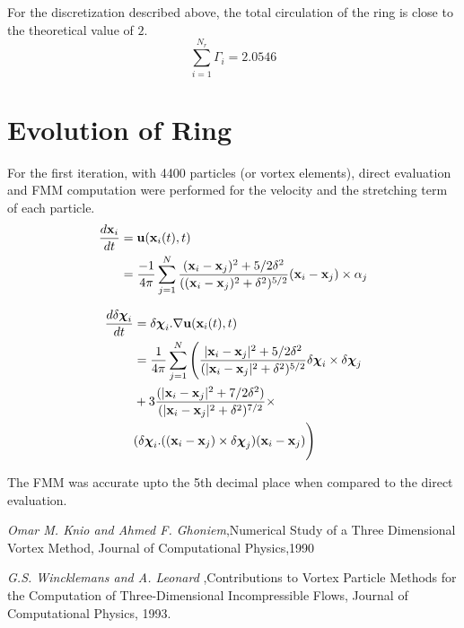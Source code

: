 \documentclass[10pt,a4paper]{report}
\newcommand{\xv}{{\bf x}}
\newcommand{\chiv}{{\boldsymbol \chi}}
\newcommand{\uv}{{\bf u}}
\begin{document}
For the discretization described above, the total circulation of the ring is close to the theoretical value of $2$.
\begin{equation}
\sum_{i=1}^{N_r} \Gamma_i = 2.0546 
\end{equation}

\section{Evolution of Ring}
For the first iteration, with 4400 particles (or vortex elements), direct evaluation and FMM computation were performed for the velocity and the stretching term of each particle.
\begin{align}
\frac{d\xv_i}{dt} &= \uv(\xv_i(t),t) \\
				&=  \frac{-1}{4\pi} \displaystyle \sum_{j=1}^{N} \frac{(\xv_i - \xv_j)^2 + 5/2 \delta^2}{((\xv_i - \xv_j)^2 + \delta^2)^{5/2}} (\xv_i - \xv_j) \times \alpha_j
\end{align}

\begin{align}
\frac{d\delta\chiv_i}{dt} &= \delta\chiv_i . \nabla \uv(\xv_i(t),t) \\
				&=  \frac{1}{4\pi} \displaystyle \sum_{j=1}^{N} \Bigg( \frac{|\xv_i - \xv_j|^2 + 5/2 \delta^2}{(|\xv_i - \xv_j|^2 + \delta^2)^{5/2}} \delta\chiv_i \times \delta\chiv_j \\
				&+ 3 \frac{(|\xv_i - \xv_j|^2 + 7/2 \delta^2)}{(|\xv_i - \xv_j|^2 + \delta^2)^{7/2}} \times \\
				&(\delta\chiv_i.((\xv_i - \xv_j)\times \delta\chiv_j)(\xv_i - \xv_j) \Bigg)
\end{align}

The FMM was accurate upto the 5th decimal place when compared to the direct evaluation. 

 







\begin{thebibliography}{3}
\emph{Omar M. Knio and Ahmed F. Ghoniem},Numerical Study of a Three Dimensional Vortex Method,
Journal of Computational Physics,1990

\emph{G.S. Wincklemans and A. Leonard}
,Contributions to Vortex Particle Methods for the Computation of Three-Dimensional Incompressible Flows,
Journal of Computational Physics, 1993.

\end{thebibliography}

 



 
\end{document}
